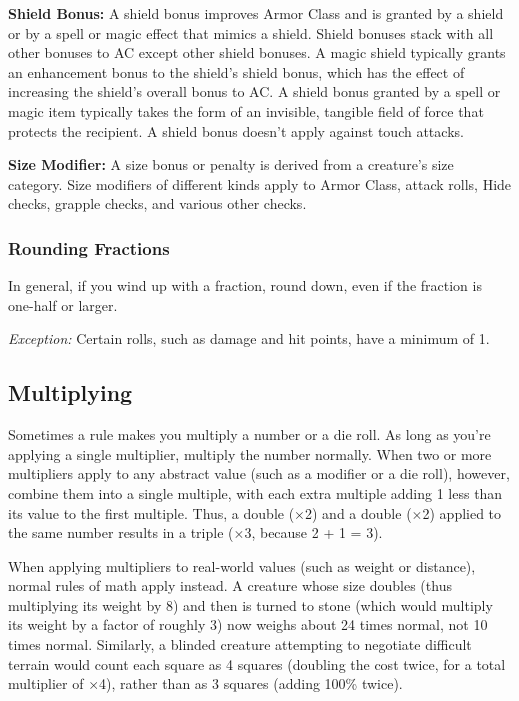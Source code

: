 \textbf{Shield Bonus:} A shield bonus improves Armor Class and is granted by a shield or by a spell or magic effect that mimics a shield. Shield bonuses stack with all other bonuses to AC except other shield bonuses. A magic shield typically grants an enhancement bonus to the shield's shield bonus, which has the effect of increasing the shield's overall bonus to AC. A shield bonus granted by a spell or magic item typically takes the form of an invisible, tangible field of force that protects the recipient. A shield bonus doesn't apply against touch attacks.

\textbf{Size Modifier:} A size bonus or penalty is derived from a creature's size category. Size modifiers of different kinds apply to Armor Class, attack rolls, Hide checks, grapple checks, and various other checks.

\subsubsection{Rounding Fractions}
In general, if you wind up with a fraction, round down, even if the fraction is one-half or larger.

\textit{Exception:} Certain rolls, such as damage and hit points, have a minimum of 1.


\subsection{Multiplying}
Sometimes a rule makes you multiply a number or a die roll. As long as you're applying a single multiplier, multiply the number normally. When two or more multipliers apply to any abstract value (such as a modifier or a die roll), however, combine them into a single multiple, with each extra multiple adding 1 less than its value to the first multiple. Thus, a double ($\times$2) and a double ($\times$2) applied to the same number results in a triple ($\times$3, because 2 + 1 = 3).

When applying multipliers to real-world values (such as weight or distance), normal rules of math apply instead. A creature whose size doubles (thus multiplying its weight by 8) and then is turned to stone (which would multiply its weight by a factor of roughly 3) now weighs about 24 times normal, not 10 times normal. Similarly, a blinded creature attempting to negotiate difficult terrain would count each square as 4 squares (doubling the cost twice, for a total multiplier of $\times$4), rather than as 3 squares (adding 100\% twice).

